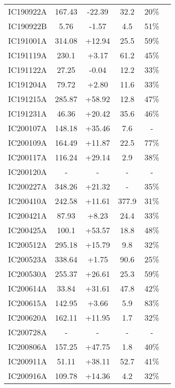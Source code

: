 \begin{longtable}[c]{||c c c c c c ||}
	IC190922A & 167.43 & -22.39 & 32.2 & 20\% & \cite{ic190922a} \\ 
	IC190922B & 5.76 & -1.57 & 4.5 & 51\% & \cite{ic190922b} \\ 
	IC191001A & 314.08 & +12.94 & 25.5 & 59\% & \cite{ic191001a} \\ 
	IC191119A & 230.1 & +3.17 & 61.2 & 45\% & \cite{ic191119a} \\ 
	IC191122A & 27.25 & -0.04 & 12.2 & 33\% & \cite{ic191122a} \\ 
	IC191204A & 79.72 & +2.80 & 11.6 & 33\% & \cite{ic191204a} \\ 
	IC191215A & 285.87 & +58.92 & 12.8 & 47\% & \cite{ic191215a} \\ 
	IC191231A & 46.36 & +20.42 & 35.6 & 46\% & \cite{ic191231a} \\ 
	IC200107A & 148.18 & +35.46 & 7.6 & - & \cite{ic200107a} \\ 
	IC200109A & 164.49 & +11.87 & 22.5 & 77\% & \cite{ic200109a} \\ 
	IC200117A & 116.24 & +29.14 & 2.9 & 38\% & \cite{ic200117a} \\ 
	IC200120A & - & - & - & - & \cite{ic200120a} \\ 
	IC200227A & 348.26 & +21.32 & - & 35\% & \cite{ic200227a} \\ 
	IC200410A & 242.58 & +11.61 & 377.9 & 31\% & \cite{ic200410a} \\ 
	IC200421A & 87.93 & +8.23 & 24.4 & 33\% & \cite{ic200421a} \\ 
	IC200425A & 100.1 & +53.57 & 18.8 & 48\% & \cite{ic200425a} \\ 
	IC200512A & 295.18 & +15.79 & 9.8 & 32\% & \cite{ic200512a} \\ 
	IC200523A & 338.64 & +1.75 & 90.6 & 25\% & \cite{ic200523a} \\ 
	IC200530A & 255.37 & +26.61 & 25.3 & 59\% & \cite{ic200530a} \\ 
	IC200614A & 33.84 & +31.61 & 47.8 & 42\% & \cite{ic200614a} \\ 
	IC200615A & 142.95 & +3.66 & 5.9 & 83\% & \cite{ic200615a} \\ 
	IC200620A & 162.11 & +11.95 & 1.7 & 32\% & \cite{ic200620a} \\ 
	IC200728A & - & - & - & - & \cite{ic200728a} \\ 
	IC200806A & 157.25 & +47.75 & 1.8 & 40\% & \cite{ic200806a} \\ 
	IC200911A & 51.11 & +38.11 & 52.7 & 41\% & \cite{ic200911a} \\ 
	IC200916A & 109.78 & +14.36 & 4.2 & 32\% & \cite{ic200916a} \\ 

\end{longtable}
